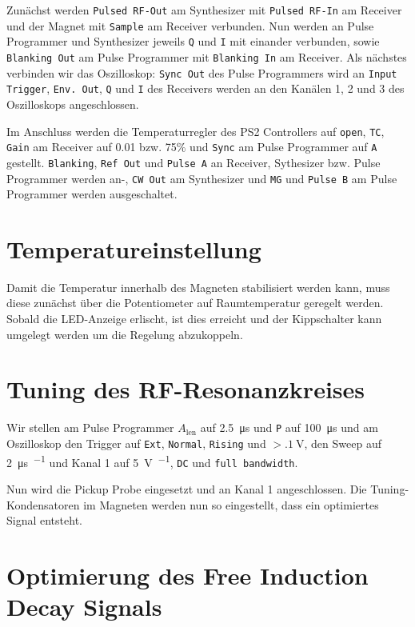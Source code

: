 Zunächst werden \texttt{Pulsed RF-Out} am Synthesizer mit \texttt{Pulsed
RF-In} am Receiver und der Magnet mit \texttt{Sample} am Receiver verbunden.
Nun werden an Pulse Programmer und Synthesizer jeweils \texttt{Q} und
\texttt{I} mit einander verbunden, sowie \texttt{Blanking Out} am Pulse
Programmer mit \texttt{Blanking In} am Receiver. Als nächstes verbinden wir
das Oszilloskop: \texttt{Sync Out} des Pulse Programmers wird an
\texttt{Input Trigger}, \texttt{Env. Out}, \texttt{Q} und \texttt{I} des
Receivers werden an den Kanälen 1, 2 und 3 des Oszilloskops angeschlossen.

Im Anschluss werden die Temperaturregler des PS2 Controllers auf
\texttt{open}, \texttt{TC}, \texttt{Gain} am Receiver
auf \num{0.01} bzw. 75\% und \texttt{Sync} am Pulse Programmer
auf \texttt{A} gestellt.
\texttt{Blanking}, \texttt{Ref Out} und \texttt{Pulse A} an
Receiver, Sythesizer bzw. Pulse Programmer werden an-, \texttt{CW Out} am
Synthesizer und \texttt{MG} und \texttt{Pulse B} am Pulse Programmer werden
ausgeschaltet. 

\section{Temperatureinstellung}

Damit die Temperatur innerhalb des Magneten stabilisiert werden kann, muss
diese zunächst über die Potentiometer auf Raumtemperatur geregelt werden.
Sobald die LED-Anzeige erlischt, ist dies erreicht und der Kippschalter kann
umgelegt werden um die Regelung abzukoppeln.

\section{Tuning des RF-Resonanzkreises}

Wir stellen am Pulse Programmer $A_\text{len}$ auf \SI{2.5}{\micro\second} und
\texttt P auf \SI{100}{\micro\second} und am Oszilloskop den Trigger auf
\texttt{Ext}, \texttt{Normal}, \texttt{Rising} und $> \SI{.1}{\volt}$, den
Sweep auf \SI{2}{\micro\second\per\division} und Kanal 1 auf
\SI{5}{\volt\per\division}, \texttt{DC} und \texttt{full bandwidth}.

Nun wird die Pickup Probe eingesetzt und an Kanal 1 angeschlossen. Die
Tuning-Kondensatoren im Magneten werden nun so eingestellt, dass ein
optimiertes Signal entsteht.

\section{Optimierung des Free Induction Decay Signals}


